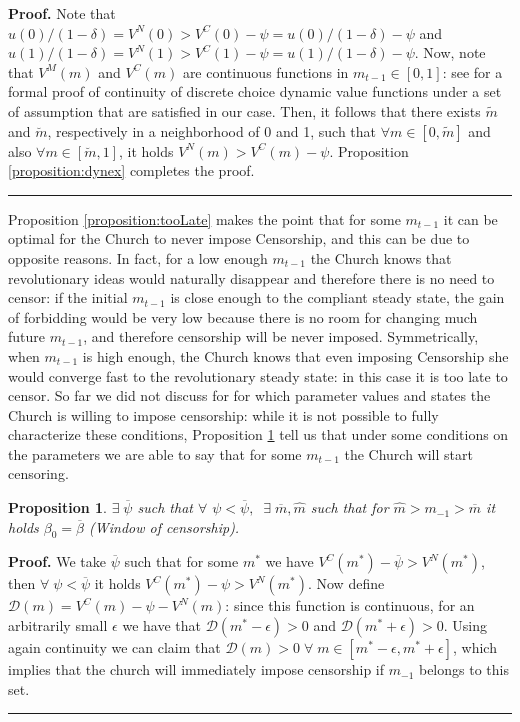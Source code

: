 \documentclass[12pt]{article}
\newtheorem{proposition}{Proposition}
\newenvironment{proof}[1][Proof]{\noindent \textbf{#1.} }{\  \rule{0.5em}{0.5em}}
\begin{document}
\begin{proof}
Note that $u(0)/(1-\delta)=V^N(0)>V^C(0)-\psi=u(0)/(1-\delta)-\psi$ and $u(1)/(1-\delta)=V^N(1)>V^C(1)-\psi=u(1)/(1-\delta)-\psi$. Now, note that $V^M(m)$ and $V^C(m)$ are continuous functions in $m_{t-1}\in[0,1]$: see  for a formal proof of continuity of discrete choice dynamic value functions under a set of assumption that are satisfied in our case. Then, it follows that there exists $\tilde{m}$ and $\breve{m}$, respectively in a neighborhood of 0 and 1, such that $\forall m\in[0,\tilde{m}]$ and also $\forall m\in[\breve{m},1]$, it holds $V^N(m)>V^C(m)-\psi$. Proposition \ref{proposition:dynex} completes the proof.
\end{proof}

Proposition \ref{proposition:tooLate} makes the point that for some $m_{t-1}$ it can be optimal for the Church to never impose Censorship, and this can be due to opposite reasons. In fact, for a low enough $m_{t-1}$ the Church knows that revolutionary ideas would naturally disappear and therefore there is no need to censor: if the initial $m_{t-1}$ is close enough to the compliant steady state, the gain of forbidding would be very low because there is no room for changing much future $m_{t-1}$, and therefore censorship will be never imposed. Symmetrically, when $m_{t-1}$ is high enough, the Church knows that even imposing Censorship she would converge  fast to the revolutionary steady state: in this case it is too late to censor.
So far we did not discuss for for which parameter values and states the Church is willing to impose censorship: while it is not possible to fully characterize these conditions, Proposition \ref{proposition:window} tell us that under some conditions on the parameters we are able to say that for some $m_{t-1}$ the Church will start censoring.
\begin{proposition}
\label{proposition:window}
$\exists\;\overline{\psi}$ such that $\forall$ $\psi<\overline{\psi},\;\;\exists \;\overline{m},\hat{m}$ such that for $\hat{m}>m_{-1}>\overline{m}$ it holds $\beta_0=\overline{\beta}$ (Window of censorship).
\end{proposition}
\begin{proof}
We take $\overline{\psi}$ such that for some $m^*$ we have $V^C(m^*)-\overline{\psi}>V^N(m^*)$, then $\forall \;\psi<\overline{\psi}$ it holds $V^C(m^*)-\psi>V^N(m^*)$. Now define $\mathcal{D}(m)=V^C(m)-\psi-V^N(m)$: since this function is continuous, for an arbitrarily small $\epsilon$ we have that $\mathcal{D}(m^*-\epsilon)>0$ and $\mathcal{D}(m^*+\epsilon)>0$. Using again continuity we can claim that $\mathcal{D}(m)>0\;\forall\;m\in[m^*-\epsilon,m^*+\epsilon]$, which implies that the church will immediately impose censorship if $m_{-1}$ belongs to this set.
\end{proof}
\end{document}

